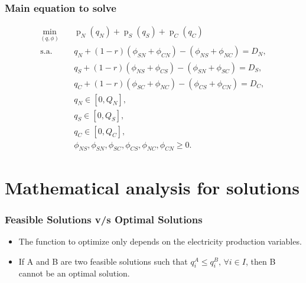 \documentclass[
11pt, %
]{beamer}
\begin{document}
	
	\begin{frame}
		\frametitle{Main equation to solve}

		\begin{equation*}\begin{aligned}
				\min_{(q,\phi)} \quad & \operatorname{p}_N(q_N)+\operatorname{p}_S(q_S)+\operatorname{p}_C(q_C) \\
				\textrm{s.a.} \quad & q_N+(1-r)(\phi_{SN}+\phi_{CN})-(\phi_{NS}+\phi_{NC})=D_N, \\
				\quad & q_S+(1-r)(\phi_{NS}+\phi_{CS})-(\phi_{SN}+\phi_{SC})=D_S, \\
				\quad & q_C+(1-r)(\phi_{SC}+\phi_{NC})-(\phi_{CS}+\phi_{CN})=D_C, \\
				& q_N\in[0,Q_N], \\
				& q_S\in[0,Q_S], \\
				& q_C\in[0,Q_C], \\
				& \phi_{NS},\phi_{SN},\phi_{SC},\phi_{CS},\phi_{NC},\phi_{CN}\geq0.
		\end{aligned}\end{equation*}
	\end{frame}
	
	
	\section{Mathematical analysis for solutions}
	\begin{frame}
		\frametitle{Feasible Solutions v/s Optimal Solutions}
		
		\begin{itemize}
			\item The function to optimize only depends on the electricity production variables.
			\item If A and B are two feasible solutions such that \(q_i^A\leq q_i^B,\,\forall i \in I\), then B cannot be an optimal solution.
		\end{itemize}
		
	\end{frame}
	
	
\end{document}
